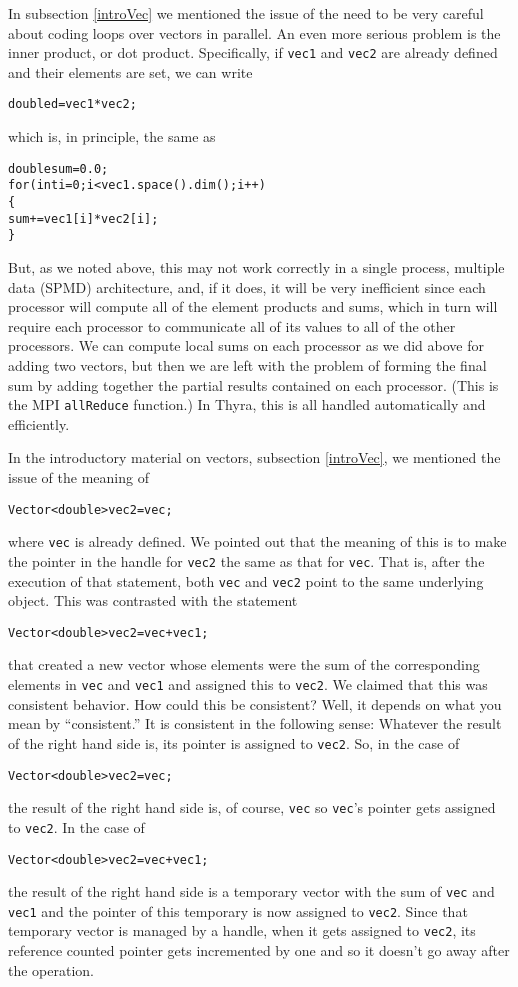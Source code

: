\documentclass[12pt]{article}
\newcommand{\thyra}{{\sf Thyra}}
\newcommand{\lcode}[1]{{\tt #1}}
\newenvironment{dcode}{  \begin{center} 
    \begin{minipage}{.9\textwidth}
     \begin{alltt}}
{\end{alltt}
    \end{minipage}
  \end{center}}
\newcommand{\bdcode}{\begin{dcode}}
\newcommand{\edcode}{\end{dcode}}
\begin{document}
In subsection \ref{introVec} we mentioned the issue of the need to be
very careful about coding loops over vectors in parallel.  An even more
serious problem is the inner product, or  dot product. Specifically,
if \lcode{vec1} and \lcode{vec2} are already defined and their
elements are set, we can write
\bdcode
double d = vec1 * vec2;
\edcode
which is, in principle, the same as 
\bdcode
double sum = 0.0; 
for (int i = 0; i < vec1.space().dim(); i++) 
  \{ 
     sum += vec1[i] * vec2[i]; 
  \} 
\edcode
But, as we noted above, this may not work correctly in a single
process, multiple data (SPMD) architecture, and, if it does, it will
be very inefficient since each processor will compute all of the
element products and sums, which in turn will require  each processor to
communicate all of its values to all of the other processors. We can
compute local sums on each processor as we did above for adding two
vectors, but then we are left with the problem of forming the final
sum by adding together the partial results contained on each
processor.  (This is the MPI \lcode{allReduce} function.)  In \thyra,
this is all handled automatically and efficiently. 

In the introductory material on vectors, subsection \ref{introVec}, we
mentioned the issue of the meaning of 
\bdcode
Vector<double> vec2 = vec;
\edcode
where \lcode{vec} is already defined.  We pointed out that the meaning
of this is to make the pointer in the handle for \lcode{vec2} the same
as that for \lcode{vec}.  That is, after the execution of that
statement, both \lcode{vec} and \lcode{vec2} point to the same
underlying object.  This was contrasted with the statement
\bdcode
Vector<double> vec2 = vec + vec1;
\edcode
that created a new vector whose elements were the sum of the
corresponding elements in \lcode{vec} and \lcode{vec1} and assigned
this to \lcode{vec2}.  We claimed that this was consistent behavior.
How could this be consistent?  Well, it depends on what you mean by
``consistent.'' It is consistent in the following sense:  Whatever the
result of the right hand side is, its pointer is assigned to
\lcode{vec2}. So, in the case of 
\bdcode
Vector<double> vec2 = vec;
\edcode
the result of the right hand side is, of course, \lcode{vec} so
\lcode{vec}'s pointer gets assigned to \lcode{vec2}.  In the case of 
\bdcode
Vector<double> vec2 = vec + vec1;
\edcode
the result of the right hand side is a temporary vector with the sum
of \lcode{vec} and \lcode{vec1} and the pointer of this temporary is
now assigned to \lcode{vec2}.  Since that temporary vector is managed
by a handle, when it gets assigned to \lcode{vec2}, its reference
counted pointer gets incremented by one and so it doesn't go away
after the operation.
\end{document}

